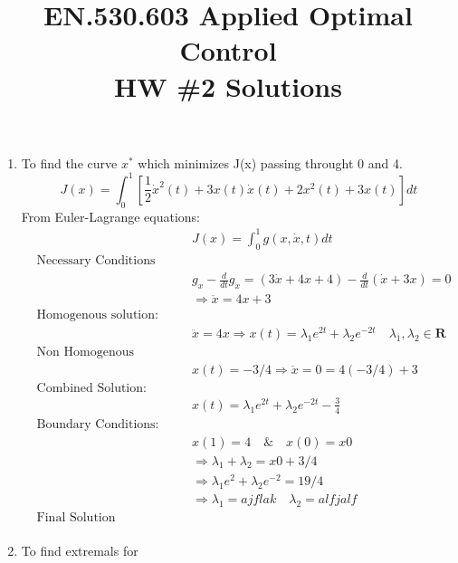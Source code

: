 
\title{EN.530.603 Applied Optimal Control \\HW \#2 Solutions}
\graphicspath{{./figures/}}

\maketitle

\begin{enumerate}

  \item To find the curve $x^*$ which minimizes J(x) passing throught 0 and 4.
  \begin{equation}
   J(x) = \int_0^1 \left[ \frac{1}{2} {\dot x}^2(t) + 3 x(t) \dot x(t) +2x^2(t) + 3x(t)\right]dt
  \end{equation}
  From Euler-Lagrange equations:
  \begin{align*}
   &&J(x) = \int_0^1 g(x,\dot x,t) dt \\
    &\text{Necessary Conditions}& \\
  &&g_x - \frac{d}{dt} g_{\dot x}  = (3 \dot x + 4x + 4) - \frac{d}{dt}(\dot x + 3x) = 0\\
   &&\Rightarrow \ddot x = 4x + 3 \\ 
   &\text{Homogenous solution:}&\\
   &&\ddot x = 4x \Rightarrow x(t) = \lambda_1 e^{2t} + \lambda_2 e^{-2t} \quad \lambda_1 , \lambda_2 \in \mathbf{R} \\
   &\text{Non Homogenous solution:}&\\
   &&x(t) = -3/4 \Rightarrow \ddot x = 0 = 4 ( -3/4) +3\\
   &\text{Combined Solution:}&\\
   && x(t) =  \lambda_1 e^{2t} + \lambda_2 e^{-2t} - \frac{3}{4} \\
   &\text{Boundary Conditions:}& \\
   &&x(1) = 4 \quad \& \quad x(0) = x0\\
   &&\Rightarrow \lambda_1 + \lambda_2 = x0 + 3/4\\
   &&\Rightarrow \lambda_1 e^2 + \lambda_2 e^{-2} = 19/4\\
   && \Rightarrow \lambda_1 = ajflak \quad \lambda_2 = alfjalf \\ 
  &\text{Final Solution}&\\
  \end{align*}
  \item To find extremals for 

\end{enumerate}
